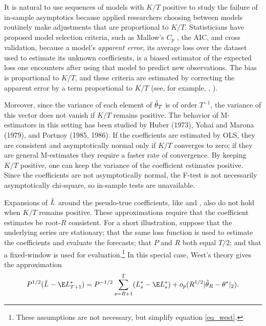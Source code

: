 \documentclass[11pt]{article} \def\baselinestretch{1.08}
\newcommand{\pp}[1]{#1} \newcommand{\intro}[1]{#1}
\begin{document}
\intro{\pp{It is natural to use sequences of models with $K/T$
    positive to study the failure of in-sample asymptotics}} because
\pp{applied researchers choosing between models routinely make adjustments
  that are proportional to $K/T$.}  Statisticians have proposed model 
selection criteria, such as Mallow's $C_p$
\cite{mallows_comments_1973}, the AIC, \cite{akaike_information_1973}
and cross validation, because a model's {\it apparent error}, its 
average loss over the dataset used to estimate its unknown
    coefficients, is a biased estimator of the expected loss one encounters after using that 
model to predict new observations. The bias is proportional to $K/T$,
and these criteria are estimated by correcting the apparent error by 
a term proportional to $K/T$ (see, for example,
     \citeyear*{efron_biased_1986},
    \citeyear*{efron_estimation_2004}). 

Moreover, \pp{since the variance of each element of $\hat \theta_{{}{T}}$ is of
  order $T^{-1}$, the variance of this vector does not vanish if $K/T$
  remains positive.}  The behavior of M-estimators in this setting has
  been studied by Huber (1973), Yohai and Marona (1979), and Portnoy
  (1985, 1986).  If the coefficients are estimated by OLS, they are
  consistent and asymptotically normal only if $K/T$ converges to
  zero; if they are general M-estimates they require a faster rate of
  convergence.  By keeping $K/T$ positive, one can keep the variance
  of the coefficient estimates positive.  Since the coefficients are
  not asymptotically normal, the F-test is not necessarily
  asymptotically chi-square, so in-sample tests are unavailable.

  \intro{\pp{Expansions of $\bar L_{}$ around the pseudo-true coefficients,
      like \possessivecite{west_asymptotic_1996} and
      \possessivecite{clark_tests_2001}, also do not hold when $K/T$ remains positive.}}
\pp{These approximations require that the coefficient
  estimates be root-$R$ consistent.} For a short illustration,
suppose that the underlying series are stationary; that the same
loss function is used to estimate the coefficients and evaluate
the forecasts; that $P$ and $R$ both equal $T/2$; and that a
fixed-window is used for evaluation.\footnote{These assumptions
  are not necessary, but simplify equation \eqref{eq_west}.} In this
special case, West's theory gives the approximation
\[
  P^{1/2} (\el{} - \E \ft{}{T+1})
  = P^{-1/2} \sum_{s=R+1}^T (\ft{}{s} - \E \ft{}{s})
  + o_p(R^{1/2} |\b{}{R} - \B{}|_2).
\]
\end{document}
